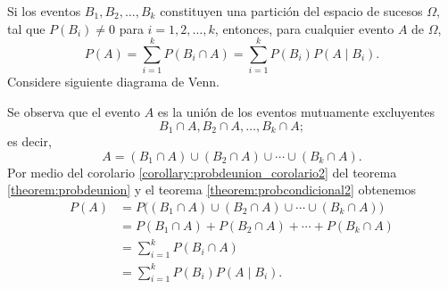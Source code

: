 \begin{theorem}{}{}
    Si los eventos $B_1, B_2, \dots, B_k$ constituyen una partición del espacio de sucesos $\Omega$, tal que $P(B_i) \neq 0$ para $i = 1, 2, \dots, k$, entonces, para cualquier evento $A$ de $\Omega$,
    $$P(A) = \sum_{i=1}^{k} P(B_i \cap A) = \sum_{i=1}^{k} P(B_i) P(A \mid B_i).$$
    \solucion Considere siguiente diagrama de Venn.
    \begin{center}
        \captionsetup*[figure]{hypcap=false}%
    \end{center}
    Se observa que el evento $A$ es la unión de los eventos mutuamente excluyentes
    $$B_1 \cap A, B_2 \cap A, \dots, B_k \cap A;$$
    es decir,
    $$A = (B_1 \cap A) \cup (B_2 \cap A) \cup \cdots \cup (B_k \cap A).$$
    Por medio del corolario \ref{corollary:probdeunion_corolario2} del teorema \ref{theorem:probdeunion} y el teorema \ref{theorem:probcondicional2} obtenemos
    \begin{align*}
        P(A) & = P\big( (B_1 \cap A) \cup (B_2 \cap A) \cup \cdots \cup (B_k \cap A) \big) \\
        & = P(B_1 \cap A) + P(B_2 \cap A) + \cdots + P(B_k \cap A) \\
        & = \sum_{i=1}^{k} P(B_i \cap A) \\
        & = \sum_{i=1}^{k} P(B_i) P(A \mid B_i).
    \end{align*}
\end{theorem}

